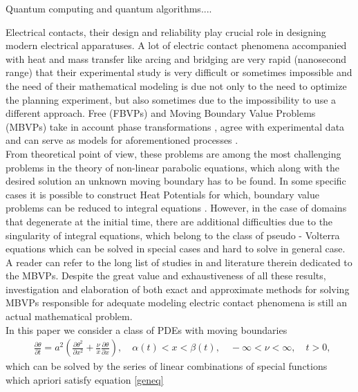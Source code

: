 \documentclass[review]{elsarticle}
\begin{document}
Quantum computing and quantum algorithms....

Electrical contacts, their design and reliability play crucial role in designing modern electrical apparatuses. A lot of electric contact phenomena accompanied with heat and mass transfer like arcing and bridging are very rapid (nanosecond range)\cite{holm2013electric, slade2017electrical} that their experimental study is very difficult or sometimes impossible and the need of their mathematical modeling is due not only to the need to optimize the planning experiment, but also sometimes due to the impossibility to use a different approach. Free (FBVPs) and Moving Boundary Value Problems (MBVPs) take in account phase transformations  \cite{friedman1970,rubinstein2000stefan}, agree with experimental data and can serve as models for aforementioned processes \cite{khar15holm,khar16ICEC,kharin2012}.\\
From theoretical point of view, these problems are among the most challenging problems in the theory of non-linear parabolic equations, which along with the desired solution an unknown moving boundary has to be found. In some specific cases it is possible to construct Heat Potentials for which, boundary value problems can be reduced to integral equations \cite{friedman1970,rubinstein2000stefan,tikhonov2013equations}. However, in the case of domains that degenerate at the initial time, there are additional difficulties due to the singularity of integral equations, which belong to the class of pseudo - Volterra equations which can be solved in special cases and hard to solve in general case. A reader can refer to the long list of studies in \cite{Tarzia2000ABO} and literature therein dedicated to the MBVPs. Despite the great value and exhaustiveness of all these results, investigation and elaboration of both exact and approximate methods for solving MBVPs responsible for adequate modeling electric contact phenomena  is still an actual mathematical problem.\\
In this paper we consider a class of PDEs with moving boundaries
\begin{align}
&\frac{\partial {\theta}}{\partial {t}} = a^2\left(\frac{\partial {\theta^2}}{\partial {x^2}} + \frac{\nu}{x}\frac{\partial{\theta}}{\partial{x}} \right),\hspace{1em} \alpha(t)<x<\beta(t),\hspace{1em}  -\infty<\nu<\infty,\hspace{1em} t>0, \label{geneq}\
\end{align}
which can be solved by the series of linear combinations of special functions which apriori satisfy equation \ref{geneq}
\end{document}
